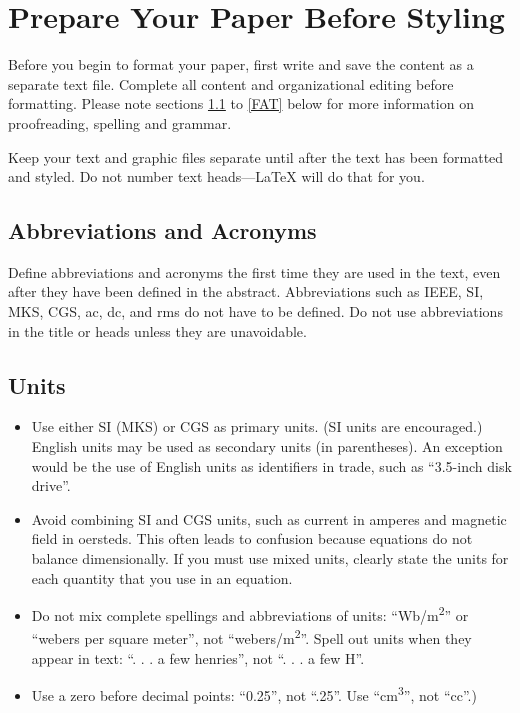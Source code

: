\section{Prepare Your Paper Before Styling}
Before you begin to format your paper, first write and save the content as a 
separate text file. Complete all content and organizational editing before 
formatting. Please note sections \ref{AA} to \ref{FAT} below for more information on 
proofreading, spelling and grammar.

Keep your text and graphic files separate until after the text has been 
formatted and styled. Do not number text heads---{\LaTeX} will do that 
for you.

\subsection{Abbreviations and Acronyms}\label{AA}
Define abbreviations and acronyms the first time they are used in the text, 
even after they have been defined in the abstract. Abbreviations such as 
IEEE, SI, MKS, CGS, ac, dc, and rms do not have to be defined. Do not use 
abbreviations in the title or heads unless they are unavoidable.

\subsection{Units}
\begin{itemize}
\item Use either SI (MKS) or CGS as primary units. (SI units are encouraged.) English units may be used as secondary units (in parentheses). An exception would be the use of English units as identifiers in trade, such as ``3.5-inch disk drive''.
\item Avoid combining SI and CGS units, such as current in amperes and magnetic field in oersteds. This often leads to confusion because equations do not balance dimensionally. If you must use mixed units, clearly state the units for each quantity that you use in an equation.
\item Do not mix complete spellings and abbreviations of units: ``Wb/m\textsuperscript{2}'' or ``webers per square meter'', not ``webers/m\textsuperscript{2}''. Spell out units when they appear in text: ``. . . a few henries'', not ``. . . a few H''.
\item Use a zero before decimal points: ``0.25'', not ``.25''. Use ``cm\textsuperscript{3}'', not ``cc''.)
\end{itemize}

